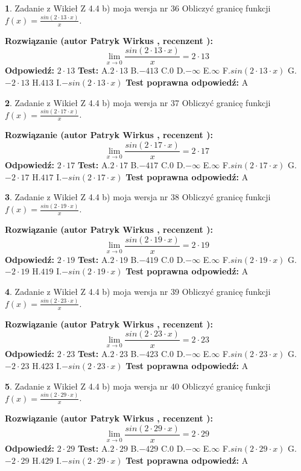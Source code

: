 \documentclass[12pt, a4paper]{article}
\theoremstyle{definition} %
\newtheorem{zad}{}
\newcommand{\zadStart}[1]{\begin{zad}#1\newline}
\newcommand{\zadStop}{\end{zad}}
\newcommand{\rozwStart}[2]{\noindent \textbf{Rozwiązanie (autor #1 , recenzent #2): }\newline}
\newcommand{\rozwStop}{\newline}
\newcommand{\odpStart}{\noindent \textbf{Odpowiedź:}\newline}
\newcommand{\odpStop}{\newline}
\newcommand{\testStart}{\noindent \textbf{Test:}\newline}
\newcommand{\testStop}{\newline}
\newcommand{\kluczStart}{\noindent \textbf{Test poprawna odpowiedź:}\newline}
\newcommand{\kluczStop}{\newline}
\begin{document}
\zadStart{Zadanie z Wikieł Z 4.4 b) moja wersja nr 36}
Obliczyć granicę funkcji $f(x)=\frac{sin(2 \cdot13\cdot x)}{x}$.
\zadStop
\rozwStart{Patryk Wirkus}{}
$$\lim\limits_{x\to 0}\frac{sin(2 \cdot 13\cdot x)}{x}=
2 \cdot 13$$
\rozwStop
\odpStart
$2 \cdot 13$
\odpStop
\testStart
A.$2 \cdot 13$
B.$-413$
C.$0$
D.$-\infty$
E.$\infty$
F.$sin(2 \cdot 13\cdot x)$
G.$-2 \cdot 13$
H.$413$
I.$-sin(2 \cdot 13\cdot x)$
\testStop
\kluczStart
A
\kluczStop



\zadStart{Zadanie z Wikieł Z 4.4 b) moja wersja nr 37}
Obliczyć granicę funkcji $f(x)=\frac{sin(2 \cdot17\cdot x)}{x}$.
\zadStop
\rozwStart{Patryk Wirkus}{}
$$\lim\limits_{x\to 0}\frac{sin(2 \cdot 17\cdot x)}{x}=
2 \cdot 17$$
\rozwStop
\odpStart
$2 \cdot 17$
\odpStop
\testStart
A.$2 \cdot 17$
B.$-417$
C.$0$
D.$-\infty$
E.$\infty$
F.$sin(2 \cdot 17\cdot x)$
G.$-2 \cdot 17$
H.$417$
I.$-sin(2 \cdot 17\cdot x)$
\testStop
\kluczStart
A
\kluczStop



\zadStart{Zadanie z Wikieł Z 4.4 b) moja wersja nr 38}
Obliczyć granicę funkcji $f(x)=\frac{sin(2 \cdot19\cdot x)}{x}$.
\zadStop
\rozwStart{Patryk Wirkus}{}
$$\lim\limits_{x\to 0}\frac{sin(2 \cdot 19\cdot x)}{x}=
2 \cdot 19$$
\rozwStop
\odpStart
$2 \cdot 19$
\odpStop
\testStart
A.$2 \cdot 19$
B.$-419$
C.$0$
D.$-\infty$
E.$\infty$
F.$sin(2 \cdot 19\cdot x)$
G.$-2 \cdot 19$
H.$419$
I.$-sin(2 \cdot 19\cdot x)$
\testStop
\kluczStart
A
\kluczStop



\zadStart{Zadanie z Wikieł Z 4.4 b) moja wersja nr 39}
Obliczyć granicę funkcji $f(x)=\frac{sin(2 \cdot23\cdot x)}{x}$.
\zadStop
\rozwStart{Patryk Wirkus}{}
$$\lim\limits_{x\to 0}\frac{sin(2 \cdot 23\cdot x)}{x}=
2 \cdot 23$$
\rozwStop
\odpStart
$2 \cdot 23$
\odpStop
\testStart
A.$2 \cdot 23$
B.$-423$
C.$0$
D.$-\infty$
E.$\infty$
F.$sin(2 \cdot 23\cdot x)$
G.$-2 \cdot 23$
H.$423$
I.$-sin(2 \cdot 23\cdot x)$
\testStop
\kluczStart
A
\kluczStop



\zadStart{Zadanie z Wikieł Z 4.4 b) moja wersja nr 40}
Obliczyć granicę funkcji $f(x)=\frac{sin(2 \cdot29\cdot x)}{x}$.
\zadStop
\rozwStart{Patryk Wirkus}{}
$$\lim\limits_{x\to 0}\frac{sin(2 \cdot 29\cdot x)}{x}=
2 \cdot 29$$
\rozwStop
\odpStart
$2 \cdot 29$
\odpStop
\testStart
A.$2 \cdot 29$
B.$-429$
C.$0$
D.$-\infty$
E.$\infty$
F.$sin(2 \cdot 29\cdot x)$
G.$-2 \cdot 29$
H.$429$
I.$-sin(2 \cdot 29\cdot x)$
\testStop
\kluczStart
A
\kluczStop
\end{document}

